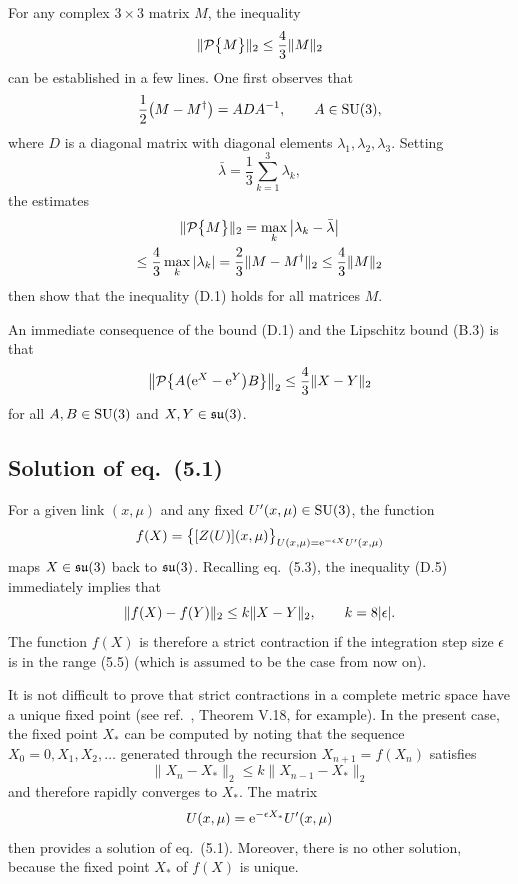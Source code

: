 For any complex $3\times3$ matrix $M$,
the inequality
\begin{equation}
  \|\mathcal{P}\bigl\{M\bigr\}\|_2\leq\frac{4}{3}\|M\|_2
\end{equation}
can be established in a few lines. One first observes that
\begin{equation}
  \frac{1}{2}\bigl(M-M^{\dagger}\bigr)=A D A^{-1},
  \qquad A\in\mathrm{SU}(3),
\end{equation}
where $D$ is a diagonal matrix with diagonal elements
$\lambda_1,\lambda_2,\lambda_3$. Setting
\begin{equation}
  \bar{\lambda}=\frac{1}{3}\sum_{k=1}^3\lambda_k,
\end{equation}
the estimates
\begin{multline}
  \|\mathcal{P}\bigl\{M\bigr\}\|_2=\max_k
  \left|\lambda_k-\bar{\lambda}\right|
  \\
  \leq\frac{4}{3}\max_k\left|\lambda_k\right|=
  \frac{2}{3}\|M-M^{\dagger}\|_2\leq\frac{4}{3}\|M\|_2
\end{multline}
then show that the inequality (D.1) holds for all matrices $M$.

An immediate consequence of the bound (D.1) and the Lipschitz bound (B.3)
is that
\begin{equation}
  \bigl\|\mathcal{P}\bigl\{A\bigl(\mathrm{e}^X-\mathrm{e}^Y\bigr)B\bigr\}\bigr\|_2\leq
  \frac{4}{3}\|X-Y\|_2
\end{equation}
for all $A,B\in\mathrm{SU}(3)$ and $X,Y\in\mathfrak{su}(3)$.


\subsection{Solution of eq.~(5.1)}

For a given link $(x,\mu)$ and any fixed $U'(x,\mu)\in\mathrm{SU}(3)$,
the function
\begin{equation}
  f(X)=\bigl\{[Z(U)](x,\mu)\bigr\}_{
  U(x,\mu)=\mathrm{e}^{-\epsilon X}U'(x,\mu)}
\end{equation}
maps $X\in\mathfrak{su}(3)$ back to $\mathfrak{su}(3)$. Recalling eq.~(5.3), the inequality
(D.5) immediately implies that
\begin{equation}
  \|f(X)-f(Y)\|_2\leq k\|X-Y\|_2,
  \qquad k=8|\epsilon|.
\end{equation}
The function $f(X)$ is therefore a strict contraction if
the integration step size $\epsilon$ is in the range (5.5) (which is assumed
to be the case from now on).

It is not difficult to prove that
strict contractions in a complete metric space
have a unique fixed point
(see ref.~\cite{ReedSimonI}, Theorem V.18, for example).
In the present case, the fixed point
$X_{*}$ can be computed by noting that
the sequence $X_0=0,X_1,X_2,\ldots$ generated through
the recursion $X_{n+1}=f(X_n)$ satisfies
\begin{equation}
  \|X_n-X_{*}\|_2\leq k\|X_{n-1}-X_{*}\|_2
\end{equation}
and therefore rapidly converges to $X_{*}$.
The matrix
\begin{equation}
  U(x,\mu)=\mathrm{e}^{-\epsilon X_{*}}U'(x,\mu)
\end{equation}
then provides a solution of eq.~(5.1).
Moreover, there is no other solution,
because the fixed point $X_{*}$ of $f(X)$ is unique.


